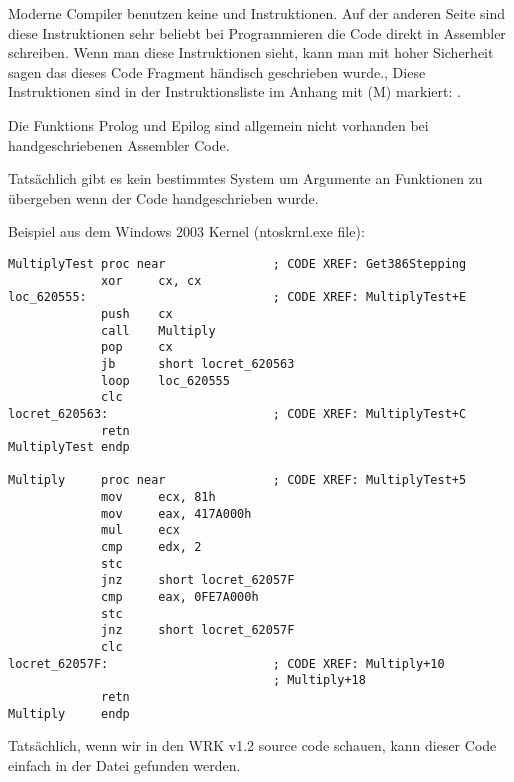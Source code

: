 Moderne Compiler benutzen keine  und  Instruktionen.
Auf der anderen Seite sind diese Instruktionen sehr beliebt bei Programmieren die Code direkt in Assembler schreiben.
Wenn man diese Instruktionen sieht, kann man mit hoher Sicherheit sagen das dieses Code Fragment händisch geschrieben wurde.,
Diese Instruktionen sind in der Instruktionsliste im Anhang mit (M) markiert: .

\par

Die Funktions Prolog und Epilog sind allgemein nicht vorhanden bei handgeschriebenen Assembler Code.
\par

Tatsächlich gibt es kein bestimmtes System um Argumente an Funktionen zu übergeben wenn der Code handgeschrieben wurde. 

\par
Beispiel aus dem Windows 2003 Kernel
(ntoskrnl.exe file):

\begin{lstlisting}[style=customasmx86]
MultiplyTest proc near               ; CODE XREF: Get386Stepping
             xor     cx, cx
loc_620555:                          ; CODE XREF: MultiplyTest+E
             push    cx
             call    Multiply
             pop     cx
             jb      short locret_620563
             loop    loc_620555
             clc
locret_620563:                       ; CODE XREF: MultiplyTest+C
             retn
MultiplyTest endp

Multiply     proc near               ; CODE XREF: MultiplyTest+5
             mov     ecx, 81h
             mov     eax, 417A000h
             mul     ecx
             cmp     edx, 2
             stc
             jnz     short locret_62057F
             cmp     eax, 0FE7A000h
             stc
             jnz     short locret_62057F
             clc
locret_62057F:                       ; CODE XREF: Multiply+10
                                     ; Multiply+18
             retn
Multiply     endp
\end{lstlisting}

Tatsächlich, wenn wir in den 
\ac{WRK} v1.2 source code schauen,
kann dieser Code einfach in der Datei
 gefunden werden.
